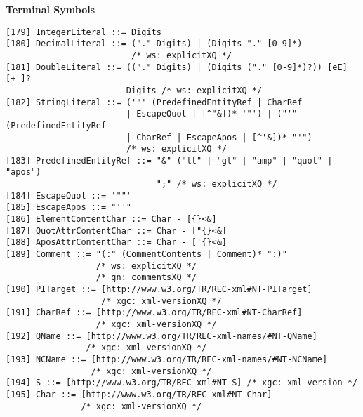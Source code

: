 \textbf{Terminal Symbols}
\begin{Verbatim}[frame=none, fontsize=\footnotesize]
[179] IntegerLiteral ::= Digits
[180] DecimalLiteral ::= ("." Digits) | (Digits "." [0-9]*)	
                         /* ws: explicitXQ */
[181] DoubleLiteral ::= (("." Digits) | (Digits ("." [0-9]*)?)) [eE] [+-]?
                        Digits /* ws: explicitXQ */
[182] StringLiteral ::= ('"' (PredefinedEntityRef | CharRef 
                        | EscapeQuot | [^"&])* '"') | ("'" (PredefinedEntityRef
                        | CharRef | EscapeApos | [^'&])* "'")	
                        /* ws: explicitXQ */
[183] PredefinedEntityRef ::= "&" ("lt" | "gt" | "amp" | "quot" | "apos")
                              ";" /* ws: explicitXQ */
[184] EscapeQuot ::= '""'
[185] EscapeApos ::= "''"
[186] ElementContentChar ::= Char - [{}<&]
[187] QuotAttrContentChar ::= Char - ["{}<&]
[188] AposAttrContentChar ::= Char - ['{}<&]
[189] Comment ::= "(:" (CommentContents | Comment)* ":)"
                  /* ws: explicitXQ */
                  /* gn: commentsXQ */
[190] PITarget ::= [http://www.w3.org/TR/REC-xml#NT-PITarget]
                   /* xgc: xml-versionXQ */
[191] CharRef ::= [http://www.w3.org/TR/REC-xml#NT-CharRef] 
                  /* xgc: xml-versionXQ */
[192] QName ::= [http://www.w3.org/TR/REC-xml-names/#NT-QName]
                /* xgc: xml-versionXQ */
[193] NCName ::= [http://www.w3.org/TR/REC-xml-names/#NT-NCName]
                 /* xgc: xml-versionXQ */
[194] S ::= [http://www.w3.org/TR/REC-xml#NT-S] /* xgc: xml-version */
[195] Char ::= [http://www.w3.org/TR/REC-xml#NT-Char] 
               /* xgc: xml-versionXQ */
\end{Verbatim}
